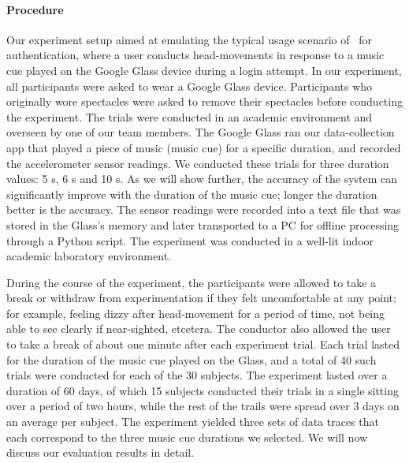\paragraph{Procedure}
Our experiment setup aimed at emulating the typical usage scenario 
of \systemname~for authentication, where a user conducts head-movements in 
response to a music cue played on the Google Glass device during a login 
attempt. 
In our experiment, all participants were asked to wear a Google Glass 
device. Participants who originally wore spectacles were asked to remove their
spectacles before conducting the experiment.
The trials were conducted in an academic environment and overseen by one of 
our team members.
The Google Glass ran our data-collection app that played a piece of 
music (music cue) for a specific duration, and recorded the accelerometer 
sensor readings. We conducted these trials for three duration values: 5 s, 
6 s and 10 s. As we will show further, the accuracy of the system can 
significantly improve with the duration of the music cue; longer the duration 
better is the accuracy. 
The sensor readings were recorded into a text file that was stored 
in the Glass's memory and later transported to a PC for offline processing
through a Python script. The experiment was conducted in a well-lit indoor 
academic laboratory environment. 
 
During the course of the experiment, the participants were allowed to take a 
break or withdraw from experimentation if they felt uncomfortable at any 
point; for example, feeling 
dizzy after head-movement for a period of time, not being able to see clearly 
if near-sighted, etcetera. The conductor also allowed the user to take a break 
of about one minute after each experiment trial.
Each trial lasted for the duration of the music cue played on the Glass, and 
a total of 40 such trials were conducted for each of the 30 subjects. 
The experiment lasted over a duration of 60 days, of which 15 
subjects conducted their trials in a single sitting over a period of two 
hours, while the rest of the trails were spread over 3 days on an average per 
subject.
The experiment yielded three sets of data traces that each correspond to 
the three music cue durations we selected. 
We will now discuss our evaluation results in detail.

